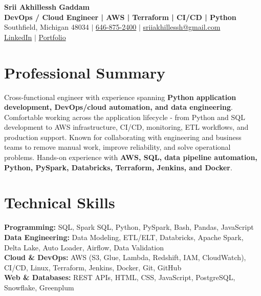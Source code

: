 \documentclass[letterpaper,10pt]{article}
\begin{document}
\fontsize{9.35pt}{10.45pt}\selectfont

\begin{center}
    {\LARGE \textbf{Srii Akhillessh Gaddam}} \\[-1pt]
    \textbf{DevOps / Cloud Engineer | AWS | Terraform | CI/CD | Python} \\[2pt]
    Southfield, Michigan 48034 $|$
    \href{tel:6468752400}{646-875-2400} $|$
    \href{mailto:sriiakhillessh@gmail.com}{sriiakhillessh@gmail.com} \\[1pt]
    \href{https://www.linkedin.com/in/srii-akhiilessh-gaddam-b48668191/}{LinkedIn} $|$
    \href{https://sriiakhillesshg.github.io/portfolio/}{Portfolio}
\end{center}
\vspace{-8pt}

\section{Professional Summary}
\small{Cross-functional engineer with experience spanning \textbf{Python application development, DevOps/cloud automation, and data engineering}. Comfortable working across the application lifecycle - from Python and SQL development to AWS infrastructure, CI/CD, monitoring, ETL workflows, and production support. Known for collaborating with engineering and business teams to remove manual work, improve reliability, and solve operational problems. Hands-on experience with \textbf{AWS, SQL, data pipeline automation, Python, PySpark, Databricks, Terraform, Jenkins, and Docker}.}

\section{Technical Skills}
\small{
\textbf{Programming:} SQL, Spark SQL, Python, PySpark, Bash, Pandas, JavaScript \\
\textbf{Data Engineering:} Data Modeling, ETL/ELT, Databricks, Apache Spark, Delta Lake, Auto Loader, Airflow, Data Validation \\
\textbf{Cloud \& DevOps:} AWS (S3, Glue, Lambda, Redshift, IAM, CloudWatch), CI/CD, Linux, Terraform, Jenkins, Docker, Git, GitHub \\
\textbf{Web \& Databases:} REST APIs, HTML, CSS, JavaScript, PostgreSQL, Snowflake, Greenplum
}
\end{document}
